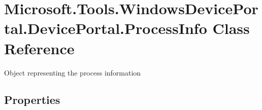 \hypertarget{class_microsoft_1_1_tools_1_1_windows_device_portal_1_1_device_portal_1_1_process_info}{}\section{Microsoft.\+Tools.\+Windows\+Device\+Portal.\+Device\+Portal.\+Process\+Info Class Reference}
\label{class_microsoft_1_1_tools_1_1_windows_device_portal_1_1_device_portal_1_1_process_info}


Object representing the process information  


\subsection*{Properties}
